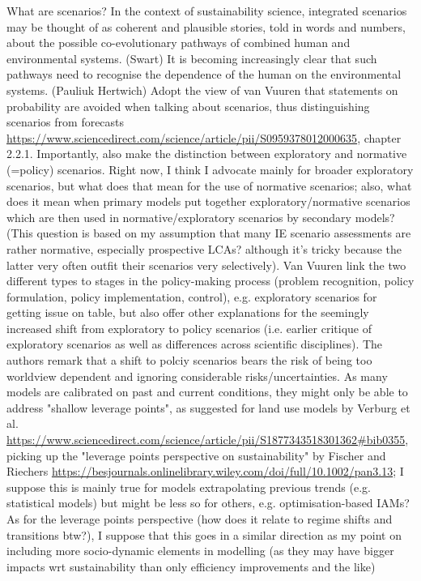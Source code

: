 \documentclass{article}
\begin{document}
What are scenarios? In the context of sustainability
science, integrated scenarios may be thought of as
coherent and plausible stories, told in words and
numbers, about the possible co-evolutionary pathways
of combined human and environmental systems. (Swart)
It is becoming increasingly clear that such pathways need to recognise the dependence of the human on the environmental systems. (Pauliuk Hertwich)
Adopt the view of van Vuuren that statements on probability are avoided when talking about scenarios, thus distinguishing scenarios from forecasts \url{https://www.sciencedirect.com/science/article/pii/S0959378012000635}, chapter 2.2.1. Importantly, also make the distinction between exploratory and normative (=policy) scenarios. Right now, I think I advocate mainly for broader exploratory scenarios, but what does that mean for the use of normative scenarios; also, what does it mean when primary models put together exploratory/normative scenarios which are then used in normative/exploratory scenarios by secondary models? (This question is based on my assumption that many IE scenario assessments are rather normative, especially prospective LCAs? although it's tricky because the latter very often outfit their scenarios very selectively). Van Vuuren link the two different types to stages in the policy-making process (problem recognition, policy formulation, policy implementation, control), e.g. exploratory scenarios for getting issue on table, but also offer other explanations for the seemingly increased shift from exploratory to policy scenarios (i.e. earlier critique of exploratory scenarios as well as differences across scientific disciplines). The authors remark that a shift to polciy scenarios bears the risk of being too worldview dependent and ignoring considerable risks/uncertainties.
As many models are calibrated on past and current conditions, they might only be able to address "shallow leverage points", as suggested for land use models by Verburg et al. \url{https://www.sciencedirect.com/science/article/pii/S1877343518301362#bib0355}, picking up the "leverage points perspective on sustainability" by Fischer and Riechers \url{https://besjournals.onlinelibrary.wiley.com/doi/full/10.1002/pan3.13}; I suppose this is mainly true for models extrapolating previous trends (e.g. statistical models) but might be less so for others, e.g. optimisation-based IAMs? As for the leverage points perspective (how does it relate to regime shifts and transitions btw?), I suppose that this goes in a similar direction as my point on including more socio-dynamic elements in modelling (as they may have bigger impacts wrt sustainability than only efficiency improvements and the like)
\end{document}
